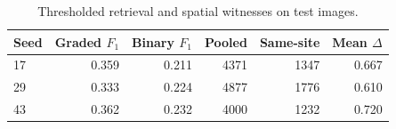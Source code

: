 \begin{table}[tbp]
    \centering
    \small
    \caption{Thresholded retrieval and spatial witnesses on test images.}
    \label{tab:spatial}
    \begin{tabular}{lrrrrr}
        \toprule
        Seed & Graded $F_{1}$ & Binary $F_{1}$ & Pooled & Same-site & Mean
        $\Delta$ \\
        \midrule
        17   & 0.359          & 0.211          & 4371   & 1347      & 0.667
        \\
        29   & 0.333          & 0.224          & 4877   & 1776      & 0.610
        \\
        43   & 0.362          & 0.232          & 4000   & 1232      & 0.720
        \\
        \bottomrule
    \end{tabular}
\end{table}
